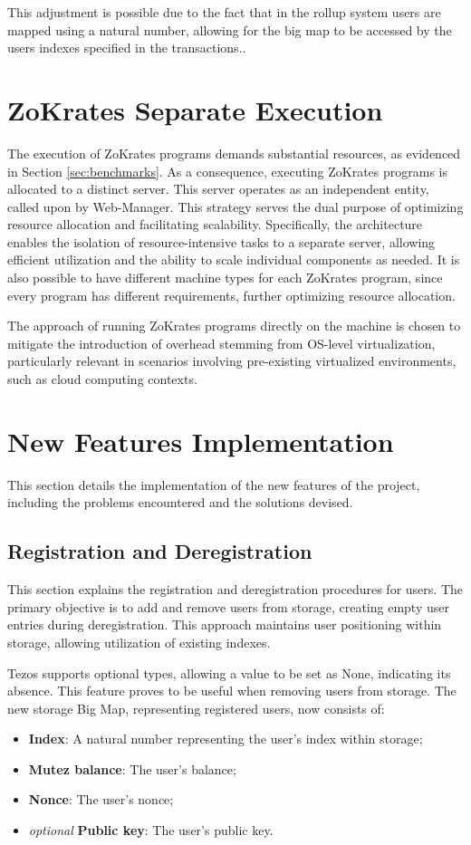 This adjustment is possible due to the fact that in the rollup system users are mapped using a natural number, allowing for the big map to be accessed by the users indexes specified in the transactions..

\section{ZoKrates Separate Execution}
The execution of ZoKrates programs demands substantial resources, as evidenced in Section \ref{sec:benchmarks}. As a consequence, executing ZoKrates programs is allocated to a distinct server. This server operates as an independent entity, called upon by Web-Manager. This strategy serves the dual purpose of optimizing resource allocation and facilitating scalability. Specifically, the architecture enables the isolation of resource-intensive tasks to a separate server, allowing efficient utilization and the ability to scale individual components as needed. It is also possible to have different machine types for each ZoKrates program, since every program has different requirements, further optimizing resource allocation.

The approach of running ZoKrates programs directly on the machine is chosen to mitigate the introduction of overhead stemming from OS-level virtualization, particularly relevant in scenarios involving pre-existing virtualized environments, such as cloud computing contexts.

\section{New Features Implementation}

This section details the implementation of the new features of the project, including the problems encountered and the solutions devised.

\subsection{Registration and Deregistration}

This section explains the registration and deregistration procedures for users. The primary objective is to add and remove users from storage, creating empty user entries during deregistration. This approach maintains user positioning within storage, allowing utilization of existing indexes.

Tezos supports optional types, allowing a value to be set as None, indicating its absence. This feature proves to be useful when removing users from storage. The new storage Big Map, representing registered users, now consists of:
\begin{itemize}
	\item \textbf{Index}: A natural number representing the user's index within storage;
	\item \textbf{Mutez balance}: The user's balance;
	\item \textbf{Nonce}: The user's nonce;
	\item \textit{optional} \textbf{Public key}: The user's public key.
\end{itemize}


